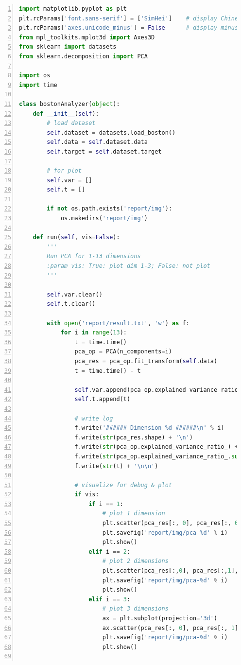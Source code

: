 \documentclass[12pt,a4paper]{article}
\theoremstyle{definition}
\begin{document}
\begin{appendix}
	\begin{lstlisting}[language=Python,
	numbers=left,
	keywordstyle=\color{blue!70},
	frame=shadowbox,
	breaklines=True]
import matplotlib.pyplot as plt
plt.rcParams['font.sans-serif'] = ['SimHei']    # display Chinese
plt.rcParams['axes.unicode_minus'] = False      # display minus sign
from mpl_toolkits.mplot3d import Axes3D
from sklearn import datasets
from sklearn.decomposition import PCA

import os
import time

class bostonAnalyzer(object):
    def __init__(self):
        # load dataset
        self.dataset = datasets.load_boston()
        self.data = self.dataset.data
        self.target = self.dataset.target
        
        # for plot
        self.var = []
        self.t = []

        if not os.path.exists('report/img'):
            os.makedirs('report/img')

    def run(self, vis=False):
        '''
        Run PCA for 1-13 dimensions
        :param vis: True: plot dim 1-3; False: not plot
        '''

        self.var.clear()
        self.t.clear()

        with open('report/result.txt', 'w') as f:
            for i in range(13):
                t = time.time()
                pca_op = PCA(n_components=i)
                pca_res = pca_op.fit_transform(self.data)
                t = time.time() - t

                self.var.append(pca_op.explained_variance_ratio_.sum())
                self.t.append(t)

                # write log
                f.write('###### Dimension %d ######\n' % i)
                f.write(str(pca_res.shape) + '\n')
                f.write(str(pca_op.explained_variance_ratio_) + '\n')
                f.write(str(pca_op.explained_variance_ratio_.sum()) + '\n')
                f.write(str(t) + '\n\n')

                # visualize for debug & plot
                if vis:
                    if i == 1:
                        # plot 1 dimension
                        plt.scatter(pca_res[:, 0], pca_res[:, 0], s=14, c=self.target)
                        plt.savefig('report/img/pca-%d' % i)
                        plt.show()
                    elif i == 2:
                        # plot 2 dimensions
                        plt.scatter(pca_res[:,0], pca_res[:,1], s=8, c=self.target)
                        plt.savefig('report/img/pca-%d' % i)
                        plt.show()
                    elif i == 3:
                        # plot 3 dimensions
                        ax = plt.subplot(projection='3d')
                        ax.scatter(pca_res[:, 0], pca_res[:, 1], pca_res[:, 2], s=8, c=self.target)
                        plt.savefig('report/img/pca-%d' % i)
                        plt.show()


\end{lstlisting}
\end{appendix}
\end{document}
